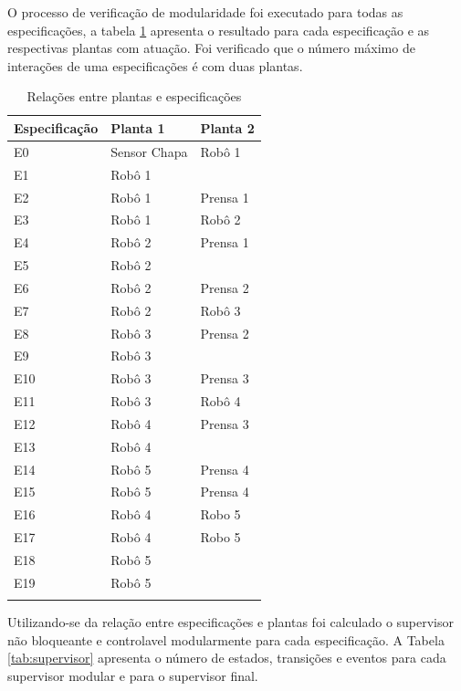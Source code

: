O processo de verificação de modularidade foi executado para todas as especificações, a tabela \ref{tab:modulos} apresenta o resultado para cada especificação e as respectivas plantas com atuação.
Foi verificado que o número máximo de interações de uma especificações é com duas plantas.

\begin{table}[h!]%
\begin{center}
\begin{minipage}{0.5\textwidth}
\caption{Relações entre plantas e especificações}
\label{tab:modulos}
\begin{tabular}{@{}lll@{}}
  \toprule
  Especificação &  Planta 1 & Planta 2\\
  \midrule
  E0 & Sensor Chapa & Robô 1\\
  E1 & Robô 1 & \\
  E2 & Robô 1 & Prensa 1\\
  E3 & Robô 1 & Robô 2\\
  E4 & Robô 2 & Prensa 1\\
  E5 & Robô 2 & \\
  E6 & Robô 2 & Prensa 2\\
  E7 & Robô 2 & Robô 3\\
  E8 & Robô 3 & Prensa 2\\
  E9 & Robô 3 & \\
  E10 & Robô 3 & Prensa 3\\
  E11 & Robô 3 & Robô 4\\
  E12 & Robô 4 & Prensa 3\\
  E13 & Robô 4 & \\
  E14 & Robô 5 & Prensa 4\\
  E15 & Robô 5 & Prensa 4\\
  E16 & Robô 4 & Robo 5\\
  E17 & Robô 4 & Robo 5\\
  E18 & Robô 5 & \\
  E19 & Robô 5 & \\
  \botrule
\end{tabular}
\end{minipage}
\end{center}
\end{table}

Utilizando-se da relação entre especificações e plantas foi calculado o supervisor não bloqueante e controlavel modularmente para cada especificação.
A Tabela \ref{tab:supervisor} apresenta o número de estados, transições e eventos para cada supervisor modular e para o supervisor final.


